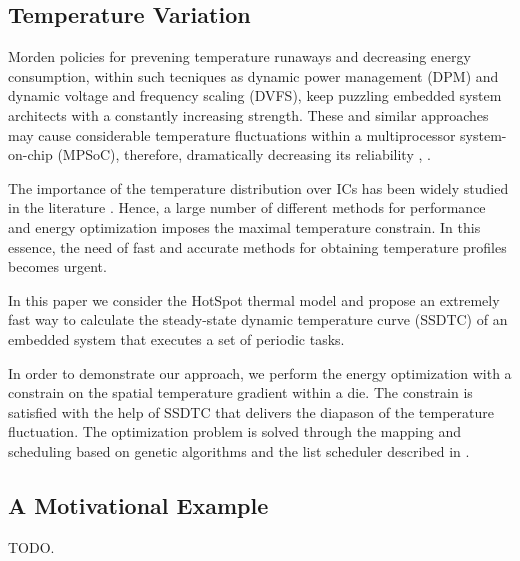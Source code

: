 \subsection{Temperature Variation}
Morden policies for prevening temperature runaways and decreasing energy consumption, within such tecniques as dynamic power management (DPM) and dynamic voltage and frequency scaling (DVFS), keep puzzling embedded system architects with a constantly increasing strength. These and similar approaches may cause considerable temperature fluctuations within a multiprocessor system-on-chip (MPSoC), therefore, dramatically decreasing its reliability \cite{mihic2004}, \cite{simunic2005}.

The importance of the temperature distribution over ICs has been widely studied in the literature \cite{lu2004}. Hence, a large number of different methods for performance and energy optimization imposes the maximal temperature constrain. In this essence, the need of fast and accurate methods for obtaining temperature profiles becomes urgent.

In this paper we consider the HotSpot thermal model \cite{huang2006} and propose an extremely fast way to calculate the steady-state dynamic temperature curve (SSDTC) of an embedded system that executes a set of periodic tasks.

In order to demonstrate our approach, we perform the energy optimization with a constrain on the spatial temperature gradient within a die. The constrain is satisfied with the help of SSDTC that delivers the diapason of the temperature fluctuation. The optimization problem is solved through the mapping and scheduling based on genetic algorithms and the list scheduler described in \cite{schmitz2004}.

\subsection{A Motivational Example}
TODO.
